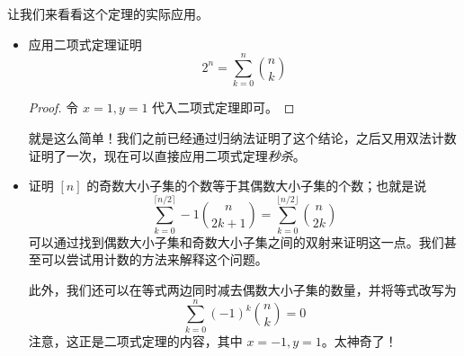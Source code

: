 \begin{example}
    让我们来看看这个定理的实际应用。

    \begin{itemize}
        \item 应用二项式定理证明
              \[2^n = \sum_{k=0}^{n}{n \choose k}\]
              \begin{proof}
                  令 $x=1, y=1$ 代入二项式定理即可。
              \end{proof}
              就是这么简单！我们之前已经通过归纳法证明了这个结论，之后又用双法计数证明了一次，现在可以直接应用二项式定理\emph{秒杀}。
        \item 证明 $[n]$ 的奇数大小子集的个数等于其偶数大小子集的个数；也就是说
              \[\sum_{k=0}^{\lceil n/2 \rceil}-1 {n \choose 2k+1} = \sum_{k=0}^{\lfloor n/2 \rfloor} {n \choose 2k}\]
              可以通过找到偶数大小子集和奇数大小子集之间的双射来证明这一点。我们甚至可以尝试用计数的方法来解释这个问题。

              此外，我们还可以在等式两边同时减去偶数大小子集的数量，并将等式改写为
              \[\sum_{k=0}^{n}(-1)^k{n \choose k}=0\]
              注意，这正是二项式定理的内容，其中 $x = -1, y = 1$。太神奇了！
    \end{itemize}
\end{example}